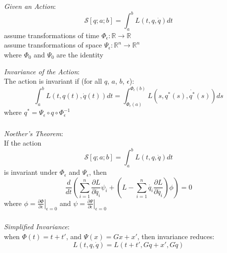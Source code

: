 \documentclass[xetex,serif,mathserif]{beamer}
\newenvironment{slide}[1]{\begin{frame}\frametitle{#1}}{\end{frame}}
\begin{document}
\begin{slide}{}
  \textcolor{titlered}{\emph{Given an Action}}: \\
  \begin{displaymath}
    \mathcal{S}[q;a;b] = \int_a^bL(t,q,\dot{q}) dt
  \end{displaymath}
  \quad assume transformations of time $\Phi_\epsilon : \mathbb{R} \to \mathbb{R}$ \\
  \quad assume transformations of space $\Psi_\epsilon : \mathbb{R}^n \to \mathbb{R}^n$ \\
  \quad\quad where $\Phi_0$ and $\Psi_0$ are the identity

  \bigskip

  \textcolor{titlered}{\emph{Invariance of the Action}}: \\
  \quad\quad The action is invariant if (for all $q$, $a$, $b$, $\epsilon$):
  \begin{displaymath}
    \int_a^bL(t,q(t),\dot{q}(t)) dt = \int_{\Phi_\epsilon(a)}^{\Phi_\epsilon(b)} L(s, q^*(s), \dot{q^*}(s)) ds
  \end{displaymath}
  \quad\quad\quad where $q^* = \Psi_\epsilon \circ q \circ \Phi_\epsilon^{-1}$
\end{slide}

\begin{slide}{}
  \textcolor{titlered}{\emph{Noether’s Theorem}}: \\
  \quad If the action
  \begin{displaymath}
    \mathcal{S}[q;a;b] = \int_a^bL(t,q,\dot{q}) dt
  \end{displaymath}
  \quad is invariant under $\Phi_\epsilon$ and $\Psi_\epsilon$, then
  \begin{displaymath}
    \frac{d}{dt}\left(\sum_{i=1}^n \frac{\partial L}{\partial \dot{q_i}}\psi_i + \left(L - \sum_{i=1}^n \dot{q_i}\frac{\partial L}{\partial \dot{q_i}}\right)\phi\right) = 0
  \end{displaymath}
  \quad where $\phi = \left.\frac{\partial \Phi}{\partial \epsilon}\right|_{\epsilon=0}$ and $\psi = \left.\frac{\partial \Psi}{\partial \epsilon}\right|_{\epsilon=0}$
\end{slide}

\begin{slide}{}
  \textcolor{titlered}{\emph{Simplified Invariance}}: \\
  \quad when $\Phi(t) = t + t'$, and $\Psi(x) = Gx + x'$, then invariance reduces:
  \begin{displaymath}
    L(t, q, \dot{q}) = L(t + t', Gq + x', G\dot{q})
  \end{displaymath}
\end{slide}
\end{document}
